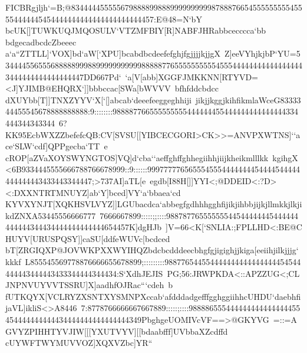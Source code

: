 {{{ FICBRgjljh`=B;@83444445555567988889988899999999998788876654555555555455554444445454444444444444444444444457:E@48=N`bY%
 bcUK[]TUWKUQJMQOSULV`VTZMFBIY[R]NABFJHRabbcecccca`bb%
 bdgecadbcdcZbeeec}
 \hbox{a`a``ZTTLL]`VOX]bd`aW[`XPU]bcabdbcdeefefghjfgjjjjkjjgX%
 Z]eeVYhjkjbP`YU=53444455655568888899988999999999998888877655555555554555444444444444444443444444444444444447DD667Pd`%
 `a[V[abb]XGGFJMKKNN[RTYVD=<J]YJIMB@EHQRX`]]bbbccac[SWa[bWVVV%
 bfhfddcbdcc}
 \hbox{dXUYbb[T]]TNXZYYV`X[`[]abcab`deeefeeggeghhiji%
 jikjjkggjkihfikmlaWceG8333344455545678888888888:9::::::::988887766555555555444444455444444444444444334444344343344%
 6?KK95EcbWXZZbefefcQB:CV[SVSU[[YIBCECGORI>CK>>=ANVPXWTNS]``ace`SLW`cdf]QPPgecba`TT%
 e}
 \hbox{cROP[aZVaXOYSWYNGTOS]VQ]d`cba``aeffghffghhegiihhjiijkheikmlllkk%
 kgihgX<6B9334445555666788766678999::9::::::9997777765655545554444444454444544444444444443433443344447;>737AI]aTL[e%
 egdb[I88H[]]YYI<;@DDEID<:?D><:DXXNTRTMNUYZ]ab`Y]bced]VY`a`bbaea`cd}
 \hbox{KYVXYNJT[XQKHSVLVYZ]]LGUbacdca`abbegfgdhhhgghfijikjihbbjijkjllmkkjlkjikdZNXA53445556666777%
 7666667899:::::;;::::98878776555555544544444445444444444444344434444444444444654457K]dgHJb%
 ]V=66<K[`SNLIA:;FPLLHD<:BE@CHUYV[URUSPQSY]]caSU[ddfeWUVc[bcdced}
 \hbox{bT[ZRGIQXP@JOVWKPXXWYIHQZbdcbcdddeecbhgfgjigighjjkiga[eeiihjilkjjjg`kkkf%
 L855545569778876666655678899;:::::::::988776544554444444444444444454544444443444443433344444344434:S`XdhJEJIS%
 PG;56:JRWPKDA<::APZZUG<;CLJNPNVUYVVTSSRU]X]aadhfOJRac```cdeh%
 b}
 \hbox{fUTKQYX[VCLRYZXSNTXYSMNPXccab`afdddadgefffgghggiihhcUHDU`daebhfijaVL]ikliS<>A8446%
 7:8778766666667667889:::::;::::988886555444444444444444455454444444444434444444444444444349PbghgeUOMIVcVF==>@GKYVG%
 =::=AGVYZPIHHTYVJIW[[[YXUTVYV][[bdaabfff]UVbbaXZcdffd}
 \hbox{cUYWFTWYMUVVOZ]XQXVZbc]YR``%
}}}
